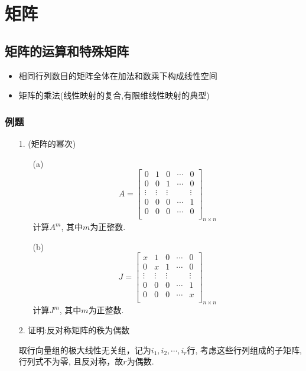 \chapter{矩阵}
\section{矩阵的运算和特殊矩阵}
\begin{itemize}
\item 相同行列数目的矩阵全体在加法和数乘下构成线性空间
\item 矩阵的乘法(线性映射的复合,有限维线性映射的典型)
\end{itemize}

\subsection*{例题}
\begin{itemize}
	\item[1.] (矩阵的幂次)
	\begin{itemize}
		\item [(a)]
		\begin{equation}
		\nonumber
		A = \begin{bmatrix}
			0& 1& 0& \cdots& 0\\
			0& 0& 1& \cdots& 0\\
			\vdots& \vdots& \vdots& & \vdots\\
			0& 0& 0& \cdots& 1\\
			0& 0& 0& \cdots& 0\\
		\end{bmatrix}_{n\times n}
		\end{equation}
		计算$A^m$, 其中$m$为正整数.
		\vspace{2cm}

		\item [(b)]
		\begin{equation}
		\nonumber
		J = \begin{bmatrix}
			x& 1& 0& \cdots& 0\\
			0& x& 1& \cdots& 0\\
			\vdots& \vdots& \vdots& & \vdots\\
			0& 0& 0& \cdots& 1\\
			0& 0& 0& \cdots& x\\
		\end{bmatrix}_{n\times n}
		\end{equation}
		计算$J^m$, 其中$m$为正整数.
		\vspace{2cm}
	\end{itemize}
	
	\item[2.] 证明:反对称矩阵的秩为偶数
	\begin{solution}
	取行向量组的极大线性无关组，记为$i_1, i_2, \cdots, i_r$行, 考虑这些行列组成的子矩阵,
	行列式不为零, 且反对称，故$r$为偶数.
	\end{solution}
	\vspace{1cm}
\end{itemize}
	

